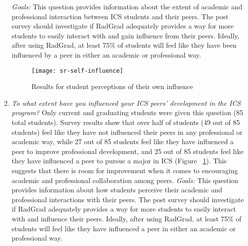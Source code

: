 \begin{enumerate}
\textit{Goals:} This question provides information about the extent of academic and professional interaction between ICS students and their peers. The post survey should investigate if RadGrad adequately provides a way for more students to easily interact with and gain influence from their peers.  Ideally, after using RadGrad, at least 75\% of students will feel like they have been influenced by a peer in either an academic or professional way. 

\begin{figure}[h]
\centering
\texttt{[image: sr-self-influence]}
\caption{Results for student perceptions of their own influence}
\label{self-influence}
\end{figure}
\item \textit{To what extent have you influenced your ICS peers’ development in the ICS program?}
Only current and graduating students were given this question (85 total students). Survey results show that over half of students (49 out of 85 students) feel like they have not influenced their peers in any professional or academic way, while 27 out of 85 students feel like they have influenced a peer to improve professional development, and 25 out of 85 students feel like they have influenced a peer to pursue a major in ICS (Figure ~\ref{self-influence}). This suggests that there is room for improvement when it comes to encouraging academic and professional collaboration among peers.
\textit{Goals:} This question provides information about how students perceive their academic and professional interactions with their peers. The post survey should investigate if RadGrad adequately provides a way for more students to easily interact with and influence their peers.  Ideally, after using RadGrad, at least 75\% of students will feel like they have influenced a peer in either an academic or professional way. 

\end{enumerate}

